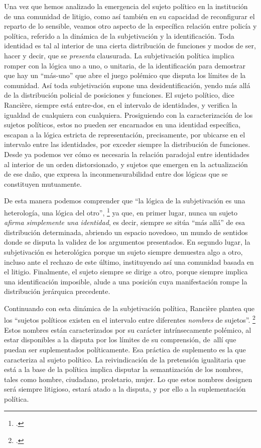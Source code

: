 Una vez que hemos analizado la emergencia del sujeto político en la institución de una comunidad de litigio, como así también en su capacidad de reconfigurar el reparto de lo sensible, veamos otro aspecto de la específica relación entre policía y política, referido a la dinámica de la subjetivación y la identificación. Toda identidad es tal al interior de una cierta distribución de funciones y modos de ser, hacer y decir, que se \emph{presenta} clausurada. La subjetivación política implica romper con la lógica uno a uno, o unitaria, de la identificación para demostrar que hay un \enquote{más-uno} que abre el juego polémico que disputa los límites de la comunidad. Así toda subjetivación supone una desidentificación, yendo más allá de la distribución policial de posiciones y funciones. El sujeto político, dice Rancière, siempre está entre-dos, en el intervalo de identidades, y verifica la igualdad de cualquiera con cualquiera. Prosiguiendo con la caracterización de los sujetos políticos, estos no pueden ser encarnados en una identidad específica, escapan a la lógica estricta de representación, precisamente, por ubicarse en el intervalo entre las identidades, por exceder siempre la distribución de funciones. Desde ya podemos ver cómo es necesaria la relación paradojal entre identidades al interior de un orden distorsionado, y sujetos que emergen en la actualización de ese daño, que expresa la inconmensurabilidad entre dos lógicas que se constituyen mutuamente.

De esta manera podemos comprender que \enquote{la lógica de la subjetivación es una heterología, una lógica del otro}, \footcite[][3]{@7082-RANCIERE2004} ya que, en primer lugar, nunca un sujeto \emph{afirma simplemente una identidad}, es decir, siempre se sitúa \enquote{más allá} de esa distribución determinada, abriendo un espacio novedoso, un mundo de sentidos donde se disputa la validez de los argumentos presentados. En segundo lugar, la subjetivación es heterológica porque un sujeto siempre demuestra algo a otro, incluso ante el rechazo de este último, instituyendo así una comunidad basada en el litigio. Finalmente, el sujeto siempre se dirige a otro, porque siempre implica una identificación imposible, alude a una posición cuya manifestación rompe la distribución jerárquica precedente.

Continuando con esta dinámica de la subjetivación política, Rancière plantea que los \enquote{sujetos políticos existen en el intervalo entre diferentes \emph{nombres} de sujetos}. \footcite[][86]{@7066-RANCIERE2007} Estos nombres están caracterizados por su carácter intrínsecamente polémico, al estar disponibles a la disputa por los límites de su comprensión, de~allí que puedan ser suplementados políticamente. Esa práctica de suplemento es la que caracteriza al sujeto político. La reivindicación de la pretensión igualitaria que está a la base de la política implica disputar la semantización de los nombres, tales como hombre, ciudadano, proletario, mujer. Lo que estos nombres designen será siempre litigioso, estará atado a la disputa, y por ello a la suplementación política.

